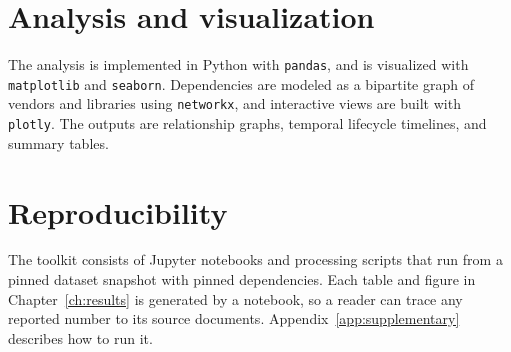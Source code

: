 \section{Analysis and visualization}
\label{sec:tooling}

The analysis is implemented in Python with \texttt{pandas}, and is
visualized with \texttt{matplotlib} and \texttt{seaborn}. Dependencies are
modeled as a bipartite graph of vendors and libraries using \texttt{networkx}, and
interactive views are built with \texttt{plotly}. The outputs are relationship
graphs, temporal lifecycle timelines, and summary tables.

\section{Reproducibility}
\label{sec:reproducibility}

The toolkit consists of Jupyter notebooks and processing scripts that run from a
pinned dataset snapshot with pinned dependencies. Each table and figure in
Chapter~\ref{ch:results} is generated by a notebook, so a reader can trace any
reported number to its source documents. Appendix~\ref{app:supplementary} describes
how to run it.
